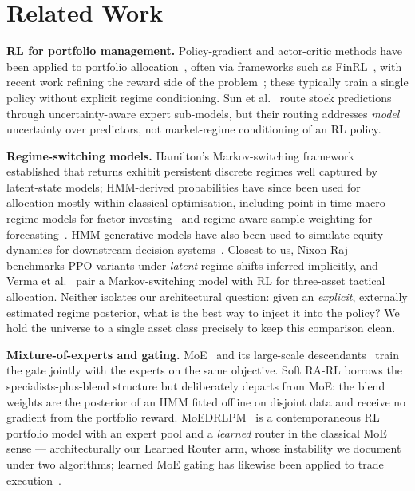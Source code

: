 \documentclass[sigconf,anonymous,review]{acmart}
\begin{document}
\section{Related Work}

\textbf{RL for portfolio management.}
Policy-gradient and actor-critic methods have been applied to portfolio
allocation~\cite{jiang2017drl,moody2001,mnih2016a2c}, often via
frameworks such as FinRL~\cite{liu2020finrl}, with recent work refining
the reward side of the problem~\cite{karzanov2025regret}; these
typically train a single policy without explicit regime conditioning.
Sun et al.~\cite{sun2022deeptrader} route stock predictions through
uncertainty-aware expert sub-models, but their routing addresses
\emph{model} uncertainty over predictors, not market-regime conditioning
of an RL policy.

\textbf{Regime-switching models.}
Hamilton's Markov-switching framework~\cite{hamilton1989} established that
returns exhibit persistent discrete regimes well captured by latent-state
models; HMM-derived probabilities have since been used for allocation
mostly within classical optimisation, including point-in-time macro-regime
models for factor investing~\cite{nuriyev2024macro} and regime-aware
sample weighting for forecasting~\cite{jang2025regime}. HMM generative
models have also been used to simulate equity dynamics for downstream
decision systems~\cite{istiaque2023hmm}. Closest to us, Nixon
Raj~\cite{nixonraj2025} benchmarks PPO variants under \emph{latent} regime
shifts inferred implicitly, and Verma et al.~\cite{verma2026} pair a
Markov-switching model with RL for three-asset tactical allocation.
Neither isolates our architectural question: given an \emph{explicit},
externally estimated regime posterior, what is the best way to inject it
into the policy? We hold the universe to a single asset class precisely to
keep this comparison clean.

\textbf{Mixture-of-experts and gating.}
MoE~\cite{jacobs1991} and its large-scale
descendants~\cite{shazeer2017moe} train the gate jointly with the experts
on the same objective. Soft RA-RL borrows the specialists-plus-blend
structure but deliberately departs from MoE: the blend weights are the
posterior of an HMM fitted offline on disjoint data and receive no
gradient from the portfolio reward. MoEDRLPM~\cite{moedrlpm2025} is a
contemporaneous RL portfolio model with an expert pool and a
\emph{learned} router in the classical MoE sense --- architecturally our
Learned Router arm, whose instability we document under two algorithms;
learned MoE gating has likewise been applied to trade
execution~\cite{xu2025moe}.
\end{document}
